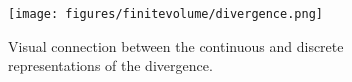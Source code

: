 \begin{figure}[ht]
    \centering
    \texttt{[image: figures/finitevolume/divergence.png]}
    \caption{Visual connection between the continuous and discrete representations of the divergence.}
    \label{fig:divergence}
\end{figure}
